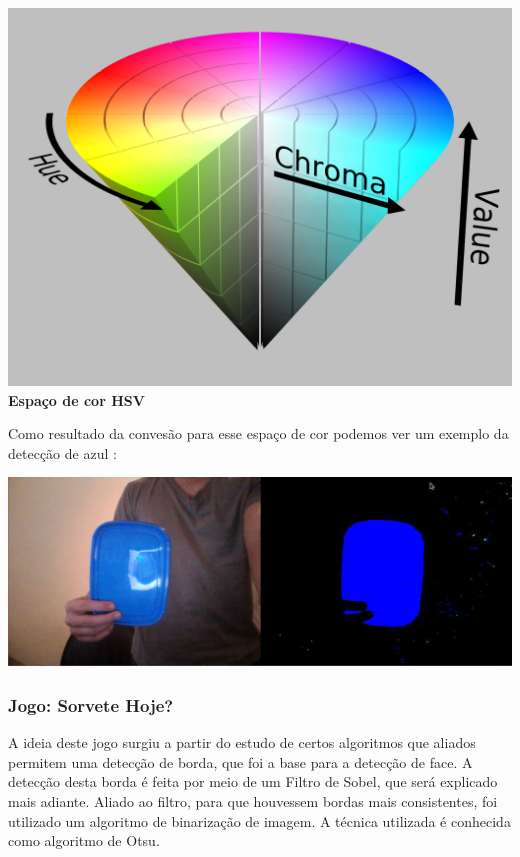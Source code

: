 \documentclass[a4paper]{article}
\begin{document}
\vspace{5.00mm}
\centering

\includegraphics[scale=0.08]{hsv.png}
\\
\centering
\textbf{\normalsize Espaço de cor HSV}
\vspace{5.00mm}

Como resultado da convesão para esse espaço de cor podemos ver um exemplo da detecção de azul :

\vspace{5.00mm}
\centering
\includegraphics[scale=0.3]{img2.jpg}

\vspace{5.00mm}



\subsubsection{Jogo: Sorvete Hoje?}

\raggedright

A ideia deste jogo surgiu a partir do estudo de certos algoritmos que aliados permitem uma detecção de borda, que foi a base para a detecção de face. A detecção desta borda é feita por meio de um Filtro de Sobel, que será explicado mais adiante. Aliado ao filtro, para que houvessem bordas mais consistentes, foi utilizado um algoritmo de binarização de imagem. A técnica utilizada é conhecida como algoritmo de Otsu.
\end{document}
